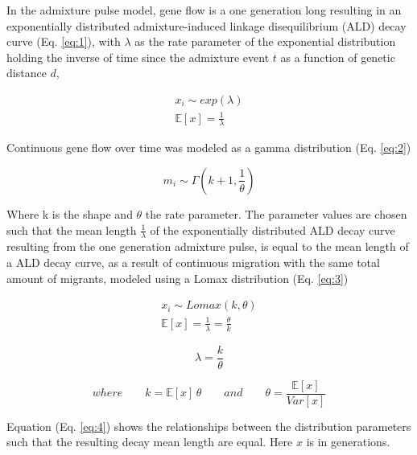 \documentclass[]{article}
\begin{document}
In the admixture pulse model, gene flow is a one generation long
resulting in an exponentially distributed admixture-induced linkage
disequilibrium (ALD) decay curve (Eq. \ref{eq:1}), with \(\lambda\) as
the rate parameter of the exponential distribution holding the inverse
of time since the admixture event \(t\) as a function of genetic
distance \(d\),

\begin{equation}
\begin{split}
\label{eq:1}
x_i \sim exp(\lambda) \\
\mathbb{E}[x] = \frac{1}{\lambda}
\end{split}
\end{equation}

Continuous gene flow over time was modeled as a gamma distribution (Eq.
\ref{eq:2})

\begin{equation}
\label{eq:2}
m_i \sim \Gamma(k+1,\frac{1}{\theta})
\end{equation}

Where k is the shape and \(\theta\) the rate parameter. The parameter
values are chosen such that the mean length \(\frac{1}{\lambda}\) of the
exponentially distributed ALD decay curve resulting from the one
generation admixture pulse, is equal to the mean length of a ALD decay
curve, as a result of continuous migration with the same total amount of
migrants, modeled using a Lomax distribution (Eq. \ref{eq:3})

\begin{equation}
\begin{split}
\label{eq:3}
x_i \sim Lomax(k,\theta) \\
\mathbb{E}[x] = \frac{1}{\lambda} = \frac{\theta}{k}
\end{split}
\end{equation}

\begin{equation}
\label{eq:4}
\lambda=\frac{k}{\theta}
\end{equation}

\begin{equation*}
\nonumber
where \qquad k=\mathbb{E}[x] \, \theta \qquad and \qquad \theta=\frac{\mathbb{E}[x]}{Var[x]}
\end{equation*}

Equation (Eq. \ref{eq:4}) shows the relationships between the
distribution parameters such that the resulting decay mean length are
equal. Here \(x\) is in generations.
\end{document}
